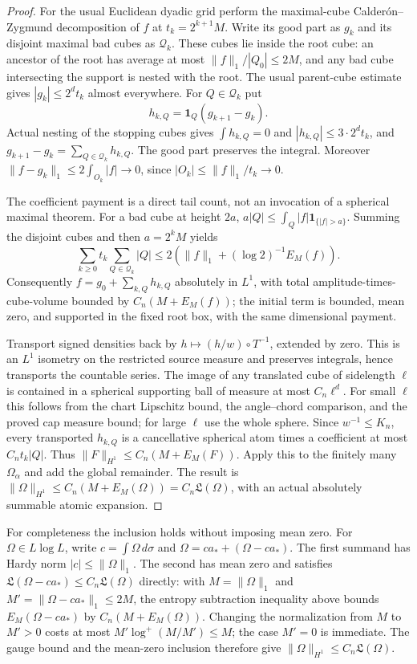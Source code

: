 \documentclass[11pt]{article}
\numberwithin{equation}{section}
\theoremstyle{remark}
\theoremstyle{definition}
\begin{document}
\begin{proof}
For the usual Euclidean dyadic grid perform the maximal-cube
Calder\'on--Zygmund decomposition of $f$ at
$t_k=2^{k+1}M$.  Write its good part as $g_k$ and its disjoint maximal
bad cubes as $\mathcal Q_k$.  These cubes lie inside the root cube:
an ancestor of the root has average at most $\|f\|_1/|Q_0|\le2M$,
and any bad cube intersecting the support is nested with the root.
The usual parent-cube estimate gives $|g_k|\le2^dt_k$ almost everywhere.
For $Q\in\mathcal Q_k$ put
\[
 h_{k,Q}=\mathbf1_Q(g_{k+1}-g_k).
\]
Actual nesting of the stopping cubes gives $\int h_{k,Q}=0$ and
$|h_{k,Q}|\le3\cdot2^dt_k$, and
$g_{k+1}-g_k=\sum_{Q\in\mathcal Q_k}h_{k,Q}$.
The good part preserves the integral.  Moreover
$\|f-g_k\|_1\le2\int_{O_k}|f|\to0$, since
$|O_k|\le\|f\|_1/t_k\to0$.

The coefficient payment is a direct tail count, not an invocation of a
spherical maximal theorem.  For a bad cube at height $2a$,
$a|Q|\le\int_Q|f|\mathbf1_{\{|f|>a\}}$.
Summing the disjoint cubes and then $a=2^kM$ yields
\[
 \sum_{k\ge0}t_k\sum_{Q\in\mathcal Q_k}|Q|
 \le2\left(\|f\|_1+(\log2)^{-1}E_M(f)\right).
\]
Consequently $f=g_0+\sum_{k,Q}h_{k,Q}$ absolutely in $L^1$,
with total amplitude-times-cube-volume bounded by
$C_n(M+E_M(f))$; the initial term is bounded, mean zero, and supported
in the fixed root box, with the same dimensional payment.

Transport signed densities back by $h\mapsto(h/w)\circ T^{-1}$,
extended by zero.  This is an $L^1$ isometry on the restricted source
measure and preserves integrals, hence transports the countable series.
The image of any translated cube of sidelength $\ell$ is contained in
a spherical supporting ball of measure at most $C_n\ell^d$.
For small $\ell$ this follows from the chart Lipschitz bound, the
angle--chord comparison, and the proved cap measure bound; for large
$\ell$ use the whole sphere.  Since $w^{-1}\le K_n$, every transported
$h_{k,Q}$ is a cancellative spherical atom times a coefficient at most
$C_nt_k|Q|$.  Thus
$\|F\|_{H^1}\le C_n(M+E_M(F))$.
Apply this to the finitely many $\Omega_\alpha$ and add the global
remainder.  The result is
$\|\Omega\|_{H^1}\le C_n(M+E_M(\Omega))=C_n\mathfrak L(\Omega)$,
with an actual absolutely summable atomic expansion.
\end{proof}

For completeness the inclusion holds without imposing mean zero.
For $\Omega\in L\log L$, write $c=\int\Omega\,d\sigma$ and
$\Omega=c a_*+(\Omega-c a_*)$. The first summand has Hardy norm
$|c|\le\|\Omega\|_1$. The second has mean zero and satisfies
$\mathfrak L(\Omega-c a_*)\le C_n\mathfrak L(\Omega)$ directly:
with $M=\|\Omega\|_1$ and $M'=\|\Omega-c a_*\|_1\le2M$, the
entropy subtraction inequality above bounds $E_M(\Omega-c a_*)$ by
$C_n(M+E_M(\Omega))$.  Changing the normalization from $M$ to $M'>0$
costs at most $M'\log^+(M/M')\le M$; the case $M'=0$ is immediate.
The gauge bound and the mean-zero inclusion therefore give
$\|\Omega\|_{H^1}\le C_n\mathfrak L(\Omega)$.
\end{document}
